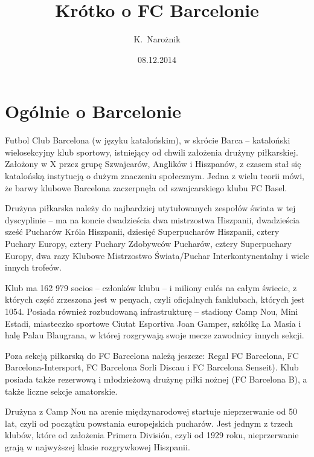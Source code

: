 \documentclass[11pt, a4paper]{article}
\author{K.~Narożnik}
\title{Krótko o FC Barcelonie}
\date{08.12.2014}
\begin{document}
\maketitle

\newpage
\tableofcontents
\newpage

\section{Ogólnie o Barcelonie}
\label{sec:Ogolnie}

Futbol Club Barcelona (w języku katalońskim), w skrócie Barca – kataloński wielosekcyjny klub sportowy, istniejący od chwili założenia drużyny piłkarskiej. Założony w X przez grupę Szwajcarów, Anglików i Hiszpanów, z czasem stał się katalońską instytucją o dużym znaczeniu społecznym. Jedna z wielu teorii mówi, że barwy klubowe Barcelona zaczerpnęła od szwajcarskiego klubu FC Basel.

Drużyna piłkarska należy do najbardziej utytułowanych zespołów świata w tej dyscyplinie – ma na koncie dwadzieścia dwa mistrzostwa Hiszpanii, dwadzieścia sześć Pucharów Króla Hiszpanii, dziesięć Superpucharów Hiszpanii, cztery Puchary Europy, cztery Puchary Zdobywców Pucharów, cztery Superpuchary Europy, dwa razy Klubowe Mistrzostwo Świata/Puchar Interkontynentalny i wiele innych trofeów.

Klub ma 162 979 socios – członków klubu – i miliony culés na całym świecie, z których część zrzeszona jest w penyach, czyli oficjalnych fanklubach, których jest 1054. Posiada również rozbudowaną infrastrukturę – stadiony Camp Nou, Mini Estadi, miasteczko sportowe Ciutat Esportiva Joan Gamper, szkółkę La Masía i halę Palau Blaugrana, w której rozgrywają swoje mecze zawodnicy innych sekcji.

Poza sekcją piłkarską do FC Barcelona należą jeszcze: Regal FC Barcelona, FC Barcelona-Intersport, FC Barcelona Sorli Discau i FC Barcelona Senseit). Klub posiada także rezerwową i młodzieżową drużynę piłki nożnej (FC Barcelona B), a także liczne sekcje amatorskie.

Drużyna z Camp Nou na arenie międzynarodowej startuje nieprzerwanie od 50 lat, czyli od początku powstania europejskich pucharów. Jest jednym z trzech klubów, które od założenia Primera División, czyli od 1929 roku, nieprzerwanie grają w najwyższej klasie rozgrywkowej Hiszpanii.
\end{document}
